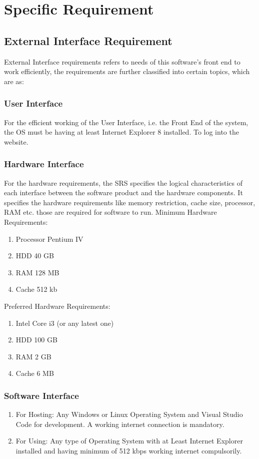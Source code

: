 \documentclass{article}
\begin{document}
\section{Specific Requirement} 
\subsection{External Interface Requirement}
External Interface requirements refers to needs of this software’s front end to work efficiently, the requirements are further classified into certain topics, which are as:
\subsubsection{User Interface}
For the efficient working of the User Interface, i.e. the Front End of the system, the OS must be having at least Internet Explorer 8 installed. To log into the website.
\subsubsection{Hardware Interface}
For the hardware requirements, the SRS specifies the logical characteristics of each interface between the software product and the hardware components. It specifies the hardware requirements like memory restriction, cache size, processor, RAM etc. those are required for software to run.
Minimum Hardware Requirements:
\begin{enumerate}
\item Processor Pentium IV
\item HDD 40 GB
\item RAM 128 MB
\item Cache 512 kb
\end{enumerate}

Preferred Hardware Requirements:
\begin{enumerate}
\item Intel Core i3 (or any latest one)
\item HDD 100 GB
\item RAM 2 GB
\item Cache 6  MB 
\end{enumerate}
\subsubsection{Software Interface}
\begin{enumerate}
\item For Hosting: Any Windows or Linux Operating System and Visual Studio Code for development. A working internet connection is  mandatory.
\item For Using: Any type of Operating System with at Least Internet Explorer installed and having minimum of 512 kbps working internet compulsorily.
\end{enumerate}
\end{document}
